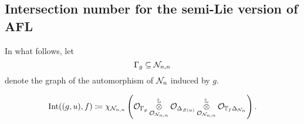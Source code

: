 \subsection{Intersection number for the semi-Lie version of AFL}
In what follows, let
\[ \Gamma_g \subseteq \mathcal N_{n,n} \]
denote the graph of the automorphism of $\mathcal N_n$ induced by $g$.
\begin{definition}
  \[
    \operatorname{Int}((g,u), f)
    \coloneqq \chi_{\mathcal N_{n,n}} \left( \mathcal{O}_{\Gamma_g}
      \mathop{\otimes}^{\mathbb L}_{\mathcal{O}_{\mathcal N_{n,n}}} \mathcal{O}_{\Delta_{\mathcal Z(u)}}
      \mathop{\otimes}^{\mathbb L}_{\mathcal{O}_{\mathcal N_{n,n}}} \mathcal{O}_{\mathbb T_f \Delta_{\mathcal N_n}} \right).
  \]
\end{definition}
